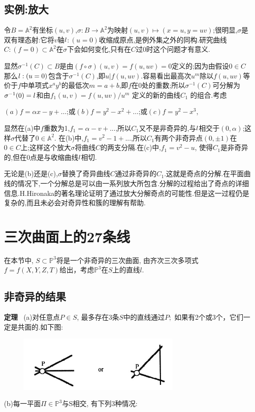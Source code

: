 \documentclass[UTF8]{book}
\begin{document}
\section{实例:放大}
令$B = \mathbb{A}^{2}$有坐标$ (u,v) $,$\sigma:B\rightarrow \mathbb{A}^{2}$为映射$(u,v)\mapsto (x = u,y = uv)$;很明显,$\sigma$是双有理态射:它将$ v $轴$\mathnormal{l}$$ :(u = 0) $收缩成原点,是例外集之外的同构.研究曲线$C:(f = 0)\subset \mathbb{A}^{2}$在$\sigma$下会如何变化,只有在$ C $过0时这个问题才有意义.


显然$\sigma^{-1}(C)\subset B$是由$(f\circ \sigma)(u,v) = f(u,uv) = 0$定义的;因为由假设$0
\in C$那么$\mathnormal{l}:(u = 0)$包含于$\sigma^{-1}(C)$,即$u|f(u,uv)$.容易看出最高次$u^{m}$除以$ f(u,uv) $等价于$ f $中单项式$x^{a}y^{b}$的最低次$ m=a+b $,即$ f $在0处的重数;所以$\sigma^{-1}(C)$可分解为$\sigma^{-1}(0) = \mathnormal{l}$和由$f_{1}(u,v) = f(u,uv)/u^{m}$ 定义的新的曲线$C_{1}$ 的组合.考虑


\begin{center}
	$(a)f = \alpha x - y +\dots$;或$(b)f = y^{2} -x^{2} +\dots$;或$(c)f = y^{2} - x^{3}$,
\end{center}


显然在(a)中$ f $重数为1,$f_{1} =\alpha - v + ...$,所以$C_{1}$又不是非奇异的,与$\mathnormal{l}$相交于$(0,\alpha)$;这样$\sigma$代替了$0\in\mathbb{A}^{2}$. 在(b)中,$f_{1} = v^{2} - 1 + ...$,所以$C_{1}$有两个非奇异点$(0,\pm 1)$在$0\in C$上;这样这个放大$\sigma $将曲线$ C $的两支分隔.在(c)中,$f_{1} = v^{2} - u$, 使得$C_{1}$是非奇异的,但在0点是与收缩曲线$\mathnormal{l}$相切.


无论是(b)还是(c),$\sigma$替换了奇异曲线$ C $通过非奇异的$C_{1}$.这就是奇点的分解.在平面曲线的情况下,一个分解总是可以由一系列放大所包含.分解的过程给出了奇点的详细信息.H.Hironaka的著名理论证明了通过放大分解奇点的可能性.但是这一过程仍是复杂的,而且未必会对奇异性和簇的理解有帮助.
	
	
\chapter{三次曲面上的27条线}
	
	
	在本节中, $S\subset \mathbb{P}^{3}$将是一个非奇异的三次曲面, 由齐次三次多项式$ f = f(X, Y, Z, T) $给出，考虑$\mathbb{P}^{3}$在$ S $上的直线$l$.
	
	\section{非奇异的结果}
	\textbf{定理} \ (a)对任意点$P\in S$, 最多存在3条$ S $中的直线通过$ P; $ 如果有2个或3个，它们一定是共面的.如下图:
	\begin{figure}[H]
		\centering
		\includegraphics[width=8cm]{102.jpg}
	\end{figure}
	(b)每一平面$\Pi \in \mathbb{P}^{3}$与S相交, 有下列3种情况:
	
\end{document}
